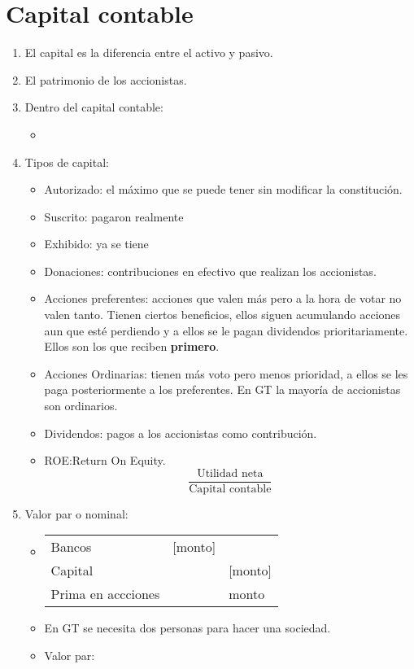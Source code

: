 \section{Capital contable}
\begin{enumerate}
    \item El capital es la diferencia entre el activo y pasivo.
    \item El patrimonio de los accionistas.
    \item Dentro del capital contable: 
        \begin{itemize}
            \item 
        \end{itemize}
    
    \item Tipos de capital: 
        \begin{itemize}
            \item Autorizado: el máximo que se puede tener sin modificar la constitución.
            \item Suscrito: pagaron realmente 
            \item Exhibido: ya se tiene
            \item Donaciones: contribuciones en efectivo que realizan los accionistas.
            \item Acciones preferentes: acciones que valen más pero a la hora de votar no valen tanto. Tienen ciertos beneficios, ellos siguen acumulando acciones aun que esté perdiendo y a ellos se le pagan dividendos prioritariamente. Ellos son los que reciben \textbf{primero}. 
            \item Acciones Ordinarias: tienen más voto pero menos prioridad, a ellos se les paga posteriormente a los preferentes. En GT la mayoría de accionistas son ordinarios. 
            \item Dividendos: pagos a los accionistas como contribución.
            \item ROE:Return On Equity. \[
              \frac{\text{Utilidad neta}}{\text{Capital contable}}
            \]
        \end{itemize}
    
    \item Valor par o nominal: 
        \begin{itemize}
            \item \begin{center}
            \begin{tabular}{ | p{5cm} | p{5cm} | p{5cm} | }
             \hline
             Bancos & [monto] & \\
             Capital & & [monto] \\ 
             Prima en accciones & & monto \\ 
             \hline
            \end{tabular}
            \end{center}
        
        \item En GT se necesita dos personas para hacer una sociedad.
        \item Valor par: 
        \end{itemize}
\end{enumerate}
